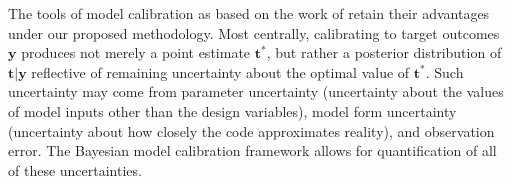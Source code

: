 \documentclass[12pt]{article}
\begin{document}
%
%
%
%
%

The tools of model calibration as based on the work of \cite{Kennedy2001} retain their advantages under our proposed methodology.
%
Most centrally, calibrating to target outcomes $\mathbf y$ produces not merely a point estimate $\mathbf t^*$, but rather a posterior distribution of $\mathbf t|\mathbf y$ reflective of remaining uncertainty about the optimal value of $\mathbf t^*$. 
%
Such uncertainty may come from parameter uncertainty (uncertainty about the values of model inputs other than the design variables), model form uncertainty (uncertainty about how closely the code approximates reality), and observation error. 
%
%
%
The Bayesian model calibration framework allows for quantification of all of these uncertainties. 
%
\end{document}
